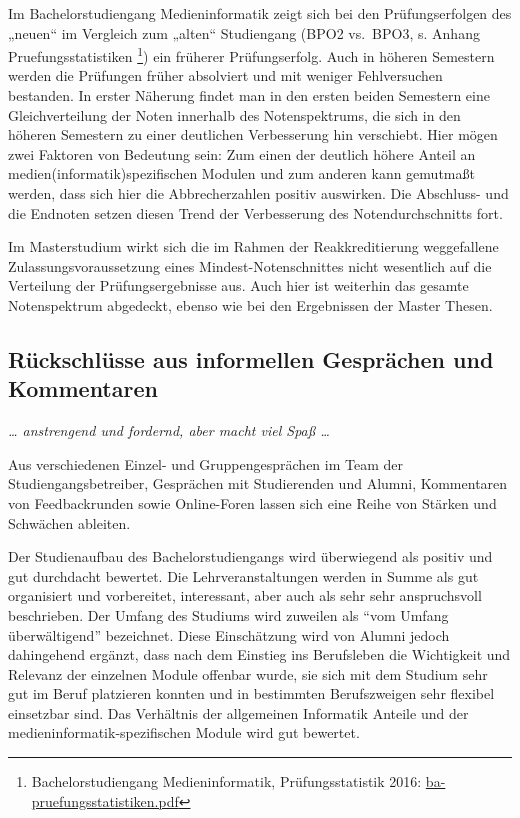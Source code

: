 Im Bachelorstudiengang Medieninformatik zeigt sich bei den
Prüfungserfolgen des „neuen`` im Vergleich zum „alten`` Studiengang
(BPO2 vs.~BPO3, s. Anhang Pruefungsstatistiken \footnote{Bachelorstudiengang
  Medieninformatik, Prüfungsstatistik 2016:
  \href{../anhaenge/ba-pruefungsstatistiken.pdf}{ba-pruefungsstatistiken.pdf}})
ein früherer Prüfungserfolg. Auch in höheren Semestern werden die
Prüfungen früher absolviert und mit weniger Fehlversuchen bestanden. In
erster Näherung findet man in den ersten beiden Semestern eine
Gleichverteilung der Noten innerhalb des Notenspektrums, die sich in den
höheren Semestern zu einer deutlichen Verbesserung hin verschiebt. Hier
mögen zwei Faktoren von Bedeutung sein: Zum einen der deutlich höhere
Anteil an medien(informatik)spezifischen Modulen und zum anderen kann
gemutmaßt werden, dass sich hier die Abbrecherzahlen positiv auswirken.
Die Abschluss- und die Endnoten setzen diesen Trend der Verbesserung des
Notendurchschnitts fort.

Im Masterstudium wirkt sich die im Rahmen der Reakkreditierung
weggefallene Zulassungsvoraussetzung eines Mindest-Notenschnittes nicht
wesentlich auf die Verteilung der Prüfungsergebnisse aus. Auch hier ist
weiterhin das gesamte Notenspektrum abgedeckt, ebenso wie bei den
Ergebnissen der Master Thesen.

\subsection{Rückschlüsse aus informellen Gesprächen und
Kommentaren}\label{ruxfcckschluxfcsse-aus-informellen-gespruxe4chen-und-kommentaren}

\emph{\ldots{} anstrengend und fordernd, aber macht viel Spaß \ldots{}}

Aus verschiedenen Einzel- und Gruppengesprächen im Team der
Studiengangsbetreiber, Gesprächen mit Studierenden und Alumni,
Kommentaren von Feedbackrunden sowie Online-Foren lassen sich eine Reihe
von Stärken und Schwächen ableiten.

Der Studienaufbau des Bachelorstudiengangs wird überwiegend als positiv
und gut durchdacht bewertet. Die Lehrveranstaltungen werden in Summe als
gut organisiert und vorbereitet, interessant, aber auch als sehr sehr
anspruchsvoll beschrieben. Der Umfang des Studiums wird zuweilen als
``vom Umfang überwältigend'' bezeichnet. Diese Einschätzung wird von
Alumni jedoch dahingehend ergänzt, dass nach dem Einstieg ins
Berufsleben die Wichtigkeit und Relevanz der einzelnen Module offenbar
wurde, sie sich mit dem Studium sehr gut im Beruf platzieren konnten und
in bestimmten Berufszweigen sehr flexibel einsetzbar sind. Das
Verhältnis der allgemeinen Informatik Anteile und der
medieninformatik-spezifischen Module wird gut bewertet.

